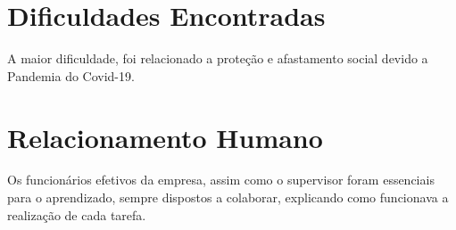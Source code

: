 \section{Dificuldades Encontradas}\label{sec:dificuldades}

A maior dificuldade, foi relacionado a proteção e afastamento social devido a Pandemia
do Covid-19. 

\section{Relacionamento Humano}\label{sec:relacionamento}

Os funcionários efetivos da empresa, assim como o supervisor foram
essenciais para o aprendizado, sempre dispostos a colaborar, explicando 
como funcionava a realização de cada tarefa.

